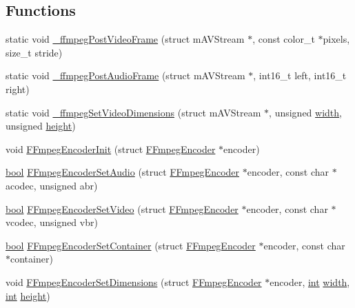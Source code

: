 \subsection*{Functions}
\begin{DoxyCompactItemize}
\item 
static void \mbox{\hyperlink{ffmpeg-encoder_8c_a991130b3e2d7c60555b6daa8e2e14511}{\+\_\+ffmpeg\+Post\+Video\+Frame}} (struct m\+A\+V\+Stream $\ast$, const color\+\_\+t $\ast$pixels, size\+\_\+t stride)
\item 
static void \mbox{\hyperlink{ffmpeg-encoder_8c_a90db63fa012864b15e512de2e3699bb5}{\+\_\+ffmpeg\+Post\+Audio\+Frame}} (struct m\+A\+V\+Stream $\ast$, int16\+\_\+t left, int16\+\_\+t right)
\item 
static void \mbox{\hyperlink{ffmpeg-encoder_8c_a0ff04375648bb618edabd7296db53aac}{\+\_\+ffmpeg\+Set\+Video\+Dimensions}} (struct m\+A\+V\+Stream $\ast$, unsigned \mbox{\hyperlink{readppm_8c_a59b7c57bf1dc7c36ac7c8232cf5bb713}{width}}, unsigned \mbox{\hyperlink{readppm_8c_ac8b624a7354198da45f5797b93b883c9}{height}})
\item 
void \mbox{\hyperlink{ffmpeg-encoder_8c_ac78d06a668741ed714dfe5e4a69a2079}{F\+Fmpeg\+Encoder\+Init}} (struct \mbox{\hyperlink{ffmpeg-encoder_8h_struct_f_fmpeg_encoder}{F\+Fmpeg\+Encoder}} $\ast$encoder)
\item 
\mbox{\hyperlink{libretro_8h_a4a26dcae73fb7e1528214a068aca317e}{bool}} \mbox{\hyperlink{ffmpeg-encoder_8c_a2c0ebf9db7aa98077c9c0b128b329c28}{F\+Fmpeg\+Encoder\+Set\+Audio}} (struct \mbox{\hyperlink{ffmpeg-encoder_8h_struct_f_fmpeg_encoder}{F\+Fmpeg\+Encoder}} $\ast$encoder, const char $\ast$acodec, unsigned abr)
\item 
\mbox{\hyperlink{libretro_8h_a4a26dcae73fb7e1528214a068aca317e}{bool}} \mbox{\hyperlink{ffmpeg-encoder_8c_a0812bb2471d9e5f5f220531bb1074798}{F\+Fmpeg\+Encoder\+Set\+Video}} (struct \mbox{\hyperlink{ffmpeg-encoder_8h_struct_f_fmpeg_encoder}{F\+Fmpeg\+Encoder}} $\ast$encoder, const char $\ast$vcodec, unsigned vbr)
\item 
\mbox{\hyperlink{libretro_8h_a4a26dcae73fb7e1528214a068aca317e}{bool}} \mbox{\hyperlink{ffmpeg-encoder_8c_abad277264801a7f376d166746514d683}{F\+Fmpeg\+Encoder\+Set\+Container}} (struct \mbox{\hyperlink{ffmpeg-encoder_8h_struct_f_fmpeg_encoder}{F\+Fmpeg\+Encoder}} $\ast$encoder, const char $\ast$container)
\item 
void \mbox{\hyperlink{ffmpeg-encoder_8c_a1f4d9332a7d88280c90cde4bca269f79}{F\+Fmpeg\+Encoder\+Set\+Dimensions}} (struct \mbox{\hyperlink{ffmpeg-encoder_8h_struct_f_fmpeg_encoder}{F\+Fmpeg\+Encoder}} $\ast$encoder, \mbox{\hyperlink{ioapi_8h_a787fa3cf048117ba7123753c1e74fcd6}{int}} \mbox{\hyperlink{readppm_8c_a59b7c57bf1dc7c36ac7c8232cf5bb713}{width}}, \mbox{\hyperlink{ioapi_8h_a787fa3cf048117ba7123753c1e74fcd6}{int}} \mbox{\hyperlink{readppm_8c_ac8b624a7354198da45f5797b93b883c9}{height}})

\end{DoxyCompactItemize}
